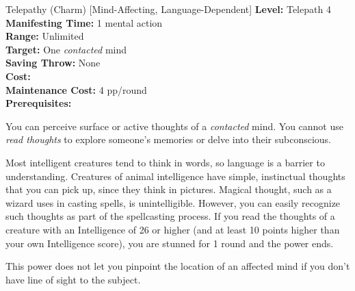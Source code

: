 {Telepathy (Charm) [Mind-Affecting, Language-Dependent]}
{
	\textbf{Level:}
	Telepath 4\\
	\textbf{Manifesting Time:}
	1 mental action\\
	\textbf{Range:}
	Unlimited\\
	\textbf{Target:}
	One \emph{contacted} mind\\
	\textbf{Saving Throw:}
	None\\
	\textbf{Cost:}
	\\
	\textbf{Maintenance Cost:}
	4 pp/round\\
	\textbf{Prerequisites:}
	\\
}
{
	You can perceive surface or active thoughts of a \emph{contacted} mind. You cannot use \emph{read thoughts} to explore someone's memories or delve into their subconscious.

	Most intelligent creatures tend to think in words, so language is a barrier to understanding.  Creatures of animal intelligence have simple, instinctual thoughts that you can pick up, since they think in pictures. Magical thought, such as a wizard uses in casting spells, is unintelligible.  However, you can easily recognize such thoughts as part of the spellcasting process. If you read the thoughts of a creature with an Intelligence of 26 or higher (and at least 10 points higher than your own Intelligence score), you are stunned for 1 round and the power ends.

	This power does not let you pinpoint the location of an affected mind if you don't have line of sight to the subject.
}